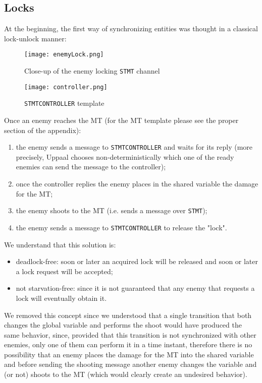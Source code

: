 \documentclass[
10pt, %
a4paper, %
oneside, %
headinclude,footinclude, %
BCOR5mm, %
]{scrartcl}
\begin{document}
		\subsection{Locks}
			At the beginning, the first way of synchronizing entities was thought in a classical lock-unlock manner:
			\begin{figure}[h!]
				\centering
				\begin{minipage}{.5\textwidth}
					\centering
					\texttt{[image: enemyLock.png]}
					\caption{Close-up of the enemy locking \texttt{STMT} channel}
				\end{minipage}
				\begin{minipage}{.4\textwidth}
					\centering
					\texttt{[image: controller.png]}
					\caption{\texttt{STMTCONTROLLER} template}
				\end{minipage}
			\end{figure}
			Once an enemy reaches the MT (for the MT template please see the proper section of the appendix):
			\begin{enumerate}
				\item the enemy sends a message to \texttt{STMTCONTROLLER} and waits for its reply (more precisely, Uppaal chooses non-deterministically which one of the ready enemies can send the message to the controller);
				\item once the controller replies the enemy places in the shared variable the damage for the MT;
				\item the enemy shoots to the MT (i.e. sends a message over \texttt{STMT});
				\item the enemy sends a message to \texttt{STMTCONTROLLER} to release the "lock".
			\end{enumerate}
			We understand that this solution is:
			\begin{itemize}
				\item deadlock-free: soon or later an acquired lock will be released and soon or later a lock request will be accepted;
				\item not starvation-free: since it is not guaranteed that any enemy that requests a lock will eventually obtain it.
			\end{itemize}
			We removed this concept since we understood that a single transition that both changes the global variable and performs the shoot would have produced the same behavior, since, provided that this transition is not synchronized with other enemies, only one of them can perform it in a time instant, therefore there is no possibility that an enemy places the damage for the MT into the shared variable and before sending the shooting message another enemy changes the variable and (or not) shoots to the MT (which would clearly create an undesired behavior).
\end{document}
